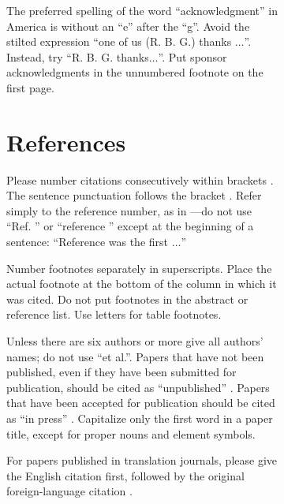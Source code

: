 \documentclass[conference]{IEEEtran}
\begin{document}
\begin{figure}[h]
\begin{figure}[h]
The preferred spelling of the word ``acknowledgment'' in America is without 
an ``e'' after the ``g''. Avoid the stilted expression ``one of us (R. B. 
G.) thanks $\ldots$''. Instead, try ``R. B. G. thanks$\ldots$''. Put sponsor 
acknowledgments in the unnumbered footnote on the first page.

\section*{References}

Please number citations consecutively within brackets \cite{b1}. The 
sentence punctuation follows the bracket \cite{b2}. Refer simply to the reference 
number, as in \cite{b3}---do not use ``Ref. \cite{b3}'' or ``reference \cite{b3}'' except at 
the beginning of a sentence: ``Reference \cite{b3} was the first $\ldots$''

Number footnotes separately in superscripts. Place the actual footnote at 
the bottom of the column in which it was cited. Do not put footnotes in the 
abstract or reference list. Use letters for table footnotes.

Unless there are six authors or more give all authors' names; do not use 
``et al.''. Papers that have not been published, even if they have been 
submitted for publication, should be cited as ``unpublished'' \cite{b4}. Papers 
that have been accepted for publication should be cited as ``in press'' \cite{b5}. 
Capitalize only the first word in a paper title, except for proper nouns and 
element symbols.

For papers published in translation journals, please give the English 
citation first, followed by the original foreign-language citation \cite{b6}.


\end{figure}
\end{figure}
\end{document}
